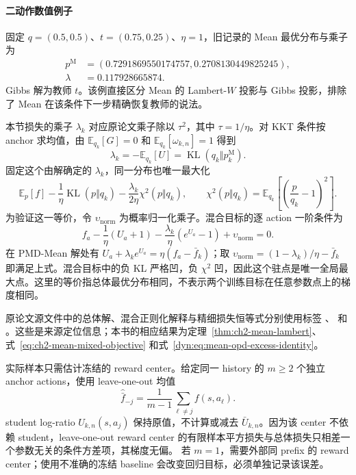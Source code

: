 \documentclass[lang=cn,scheme=chinese,openany]{../book/elegantbook}
\begin{document}
\paragraph{二动作数值例子}
固定 $q=(0.5,0.5)$、$t=(0.75,0.25)$、$\eta=1$，旧记录的 Mean 最优分布与乘子为
\begin{align*}
p^{\mathrm M}&=(0.7291869550174757,0.2708130449825245),\\
\lambda&=0.117928665874.
\end{align*}
Gibbs 解为教师 $t$。该例直接区分 Mean 的 Lambert-$W$ 投影与 Gibbs 投影，排除了 Mean 在该条件下一步精确恢复教师的说法。

本节损失的乘子 $\lambda_k$ 对应原论文乘子除以 $\tau^2$，其中 $\tau=1/\eta$。对 KKT 条件按 anchor 求均值，由 $\mathbb E_{ q_k}[G]=0$ 和 $\mathbb E_{ q_k}[\omega_{k,n}]=1$ 得到
\begin{equation*}
\lambda_k=-\mathbb E_{ q_k}[U]
=\operatorname{KL}( q_k\Vert p_k^{\mathrm M}).
\end{equation*}
固定这个由解确定的 $\lambda_k$，同一分布也唯一最大化
\begin{equation}
\mathbb E_p[f]-\frac1\eta\operatorname{KL}(p\Vert q_k)
-\frac{\lambda_k}{2\eta}\chi^2(p\Vert q_k),
\qquad
\chi^2(p\Vert q_k)=\mathbb E_{ q_k}\left[\left(\frac p{ q_k}-1\right)^2\right].
\label{eq:ch2-mean-mixed-objective}
\end{equation}
为验证这一等价，令 $\upsilon_{\mathrm{norm}}$ 为概率归一化乘子。混合目标的逐 action 一阶条件为
\begin{equation*}
f_a-\frac1\eta(U_a+1)-\frac{\lambda_k}{\eta}(e^{U_a}-1)+\upsilon_{\mathrm{norm}}=0.
\end{equation*}
在 PMD-Mean 解处有 $U_a+\lambda_k e^{U_a}=\eta(f_a-\bar f_k)$；取
$\upsilon_{\mathrm{norm}}=(1-\lambda_k)/\eta-\bar f_k$ 即满足上式。混合目标中的负 KL 严格凹，负 $\chi^2$ 凹，因此这个驻点是唯一全局最大点。这里的等价指总体最优分布相同，不表示两个训练目标在任意参数点上的梯度相同。


原论文源文件中的总体解、混合正则化解释与精细损失恒等式分别使用标签 、 和 。这些是来源定位信息；本书的相应结果为定理~\ref{thm:ch2-mean-lambert}、式~\eqref{eq:ch2-mean-mixed-objective} 和式~\eqref{dyn:eq:mean-opd-excess-identity}。

实际样本只需估计冻结的 reward center。给定同一 history 的 $m\ge2$ 个独立 anchor actions，使用 leave-one-out 均值
\begin{equation*}
\widehat{\bar f}_{-j}=\frac1{m-1}\sum_{\ell\ne j}f(s,a_\ell).
\end{equation*}
student log-ratio $U_{k,n}(s,a_j)$ 保持原值，不计算或减去 $\bar U_{k,n}$。因为该 center 不依赖 student，leave-one-out reward center 的有限样本平方损失与总体损失只相差一个参数无关的条件方差项，其梯度无偏。
若 $m=1$，需要外部同 prefix 的 reward center；使用不准确的冻结 baseline 会改变回归目标，必须单独记录该误差。
\end{document}
